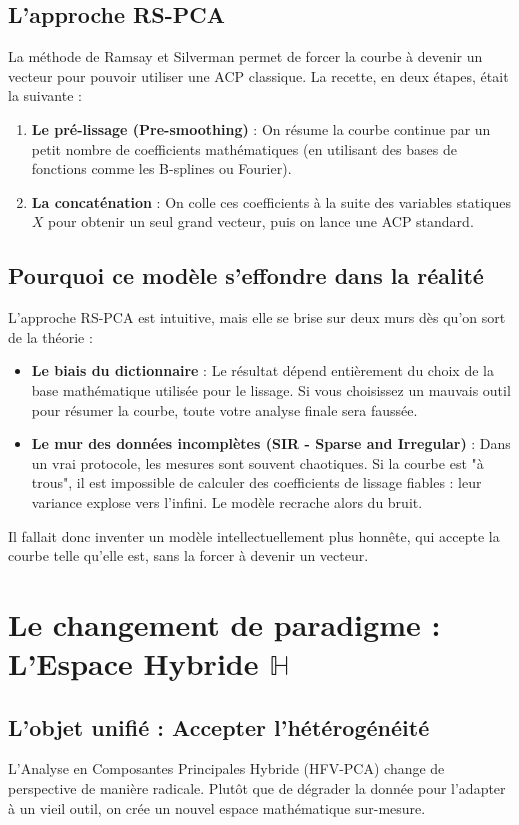 \documentclass[11pt, a4paper]{article}
\begin{document}
\subsection{L'approche RS-PCA}
La méthode de Ramsay et Silverman permet de forcer la courbe à devenir un vecteur pour pouvoir utiliser une ACP classique. 
La recette, en deux étapes, était la suivante :
\begin{enumerate}
    \item \textbf{Le pré-lissage (Pre-smoothing)} : On résume la courbe continue par un petit nombre de coefficients mathématiques (en utilisant des bases de fonctions comme les B-splines ou Fourier). 
    \item \textbf{La concaténation} : On colle ces coefficients à la suite des variables statiques $X$ pour obtenir un seul grand vecteur, puis on lance une ACP standard.
\end{enumerate}

\subsection{Pourquoi ce modèle s'effondre dans la réalité}
L'approche RS-PCA est intuitive, mais elle se brise sur deux murs dès qu'on sort de la théorie :
\begin{itemize}
    \item \textbf{Le biais du dictionnaire} : Le résultat dépend entièrement du choix de la base mathématique utilisée pour le lissage. Si vous choisissez un mauvais outil pour résumer la courbe, toute votre analyse finale sera faussée.
    \item \textbf{Le mur des données incomplètes (SIR - Sparse and Irregular)} : Dans un vrai protocole, les mesures sont souvent chaotiques. Si la courbe est "à trous", il est impossible de calculer des coefficients de lissage fiables : leur variance explose vers l'infini. Le modèle recrache alors du bruit.
\end{itemize}
Il fallait donc inventer un modèle intellectuellement plus honnête, qui accepte la courbe telle qu'elle est, sans la forcer à devenir un vecteur.

\section{Le changement de paradigme : L'Espace Hybride $\mathbb{H}$}

\subsection{L'objet unifié : Accepter l'hétérogénéité}
L'Analyse en Composantes Principales Hybride (HFV-PCA) change de perspective de manière radicale. Plutôt que de dégrader la donnée pour l'adapter à un vieil outil, on crée un nouvel espace mathématique sur-mesure.
\end{document}
